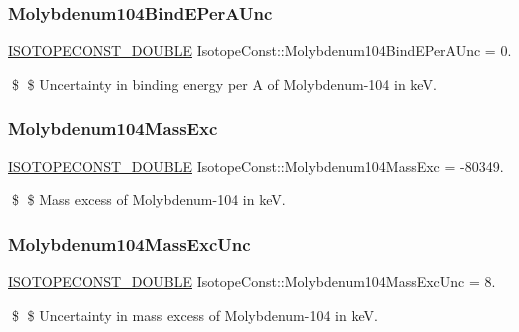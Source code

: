 \subsubsection{\texorpdfstring{Molybdenum104\+Bind\+E\+Per\+A\+Unc}{Molybdenum104BindEPerAUnc}}
{\footnotesize\ttfamily \mbox{\hyperlink{group___isotope_const-_macros_ga8f45a7272ce02c0b4c65c44636ed719a}{I\+S\+O\+T\+O\+P\+E\+C\+O\+N\+S\+T\+\_\+\+D\+O\+U\+B\+LE}} Isotope\+Const\+::\+Molybdenum104\+Bind\+E\+Per\+A\+Unc = 0.}

\$ \$ Uncertainty in binding energy per A of Molybdenum-\/104 in keV. \mbox{\label{group___isotope_const-_molybdenum-_mo104_gac0f4a5a3b46e27731a86d2bb8b60f379}} 
\subsubsection{\texorpdfstring{Molybdenum104\+Mass\+Exc}{Molybdenum104MassExc}}
{\footnotesize\ttfamily \mbox{\hyperlink{group___isotope_const-_macros_ga8f45a7272ce02c0b4c65c44636ed719a}{I\+S\+O\+T\+O\+P\+E\+C\+O\+N\+S\+T\+\_\+\+D\+O\+U\+B\+LE}} Isotope\+Const\+::\+Molybdenum104\+Mass\+Exc = -\/80349.}

\$ \$ Mass excess of Molybdenum-\/104 in keV. \mbox{\label{group___isotope_const-_molybdenum-_mo104_gae3949d7c43354fd379c150e73ca2a09c}} 
\subsubsection{\texorpdfstring{Molybdenum104\+Mass\+Exc\+Unc}{Molybdenum104MassExcUnc}}
{\footnotesize\ttfamily \mbox{\hyperlink{group___isotope_const-_macros_ga8f45a7272ce02c0b4c65c44636ed719a}{I\+S\+O\+T\+O\+P\+E\+C\+O\+N\+S\+T\+\_\+\+D\+O\+U\+B\+LE}} Isotope\+Const\+::\+Molybdenum104\+Mass\+Exc\+Unc = 8.}

\$ \$ Uncertainty in mass excess of Molybdenum-\/104 in keV. \mbox{\label{group___isotope_const-_molybdenum-_mo104_gae64ea6235001deecca402986f38fcfd0}} 
